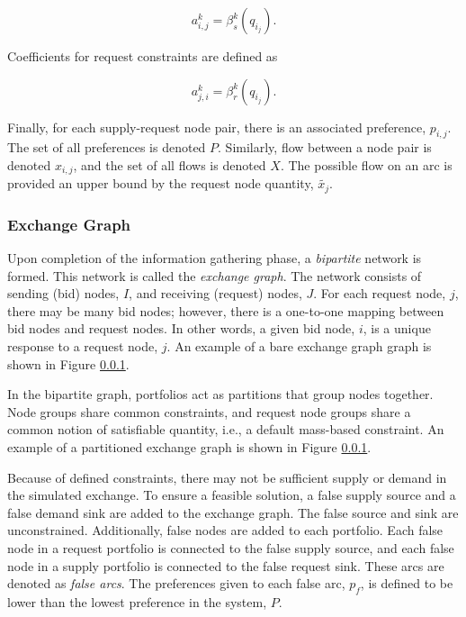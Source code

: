 \begin{equation}
  a^k_{i, j} = \beta_s^k(q_{i_j}).
\end{equation}

Coefficients for request constraints are defined as

\begin{equation}
  a^k_{j, i} = \beta_r^k(q_{i_j}).
\end{equation}

Finally, for each supply-request node pair, there is an associated preference,
$p_{i, j}$. The set of all preferences is denoted $P$. Similarly, flow between a
node pair is denoted $x_{i, j}$, and the set of all flows is denoted $X$. The
possible flow on an arc is provided an upper bound by the request node quantity,
$\tilde{x_j}$.

\subsubsection{Exchange Graph}

Upon completion of the information gathering phase, a \textit{bipartite} network
is formed. This network is called the \textit{exchange graph}. The network
consists of sending (bid) nodes, $I$, and receiving (request) nodes, $J$. For
each request node, $j$, there may be many bid nodes; however, there is a
one-to-one mapping between bid nodes and request nodes. In other words, a given
bid node, $i$, is a unique response to a request node, $j$. An example of a bare
exchange graph graph is shown in Figure \ref{}.


In the bipartite graph, portfolios act as partitions that group nodes
together. Node groups share common constraints, and request node groups share a
common notion of satisfiable quantity, i.e., a default mass-based constraint. An
example of a partitioned exchange graph is shown in Figure \ref{}. 


Because of defined constraints, there may not be sufficient supply or demand in
the simulated exchange. To ensure a feasible solution, a false supply source and
a false demand sink are added to the exchange graph. The false source and sink
are unconstrained. Additionally, false nodes are added to each portfolio. Each
false node in a request portfolio is connected to the false supply source, and
each false node in a supply portfolio is connected to the false request
sink. These arcs are denoted as \textit{false arcs}. The preferences given to
each false arc, $p_f$, is defined to be lower than the lowest preference in the
system, $P$.

